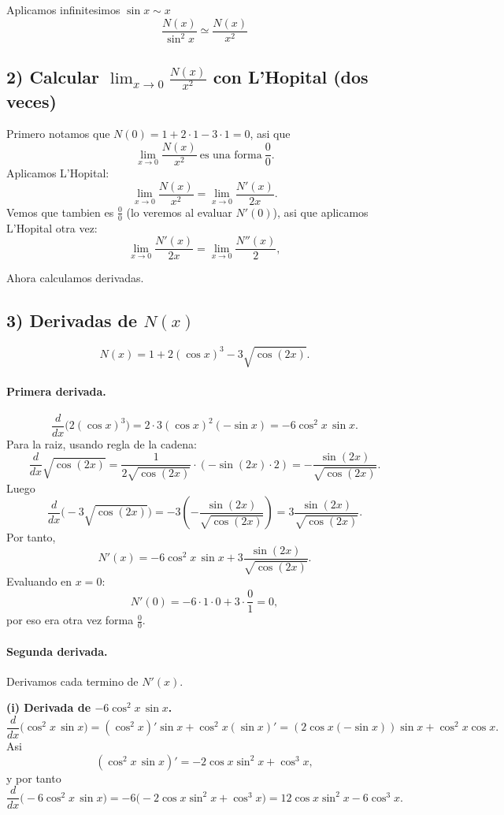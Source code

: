 \documentclass[12pt]{article}
\begin{document}
Aplicamos infinitesimos $\sin x \sim x$
\[
\frac{N(x)}{\sin^2 x}
\simeq \frac{N(x)}{x^2}
\]


\subsection*{2) Calcular $\displaystyle \lim_{x\to 0}\frac{N(x)}{x^2}$ con L'Hopital (dos veces)}
Primero notamos que $N(0)=1+2\cdot 1-3\cdot 1=0$, asi que
\[
\lim_{x\to 0}\frac{N(x)}{x^2}
\ \text{es una forma}\ \frac{0}{0}.
\]
Aplicamos L'Hopital:
\[
\lim_{x\to 0}\frac{N(x)}{x^2}
=\lim_{x\to 0}\frac{N'(x)}{2x}.
\]
Vemos que tambien es $\frac{0}{0}$ (lo veremos al evaluar $N'(0)$), asi que aplicamos L'Hopital otra vez:
\[
\lim_{x\to 0}\frac{N'(x)}{2x}
=\lim_{x\to 0}\frac{N''(x)}{2},
\]

Ahora calculamos derivadas.

\subsection*{3) Derivadas de $N(x)$}
\[
N(x)=1+2(\cos x)^3-3\sqrt{\cos(2x)}.
\]

\paragraph{Primera derivada.}
\[
\frac{d}{dx}\bigl(2(\cos x)^3\bigr)=2\cdot 3(\cos x)^2(-\sin x)=-6\cos^2 x\,\sin x.
\]
Para la raiz, usando regla de la cadena:
\[
\frac{d}{dx}\sqrt{\cos(2x)}
=\frac{1}{2\sqrt{\cos(2x)}}\cdot(-\sin(2x)\cdot 2)
=-\frac{\sin(2x)}{\sqrt{\cos(2x)}}.
\]
Luego
\[
\frac{d}{dx}\bigl(-3\sqrt{\cos(2x)}\bigr)
=-3\left(-\frac{\sin(2x)}{\sqrt{\cos(2x)}}\right)
=3\frac{\sin(2x)}{\sqrt{\cos(2x)}}.
\]
Por tanto,
\[
N'(x)=-6\cos^2 x\,\sin x+3\frac{\sin(2x)}{\sqrt{\cos(2x)}}.
\]
Evaluando en $x=0$:
\[
N'(0)=-6\cdot 1\cdot 0+3\cdot \frac{0}{1}=0,
\]
por eso era otra vez forma $\frac{0}{0}$.

\paragraph{Segunda derivada.}
Derivamos cada termino de $N'(x)$.

\textbf{(i) Derivada de $-6\cos^2 x\,\sin x$.}
\[
\frac{d}{dx}\bigl(\cos^2 x\,\sin x\bigr)
=(\cos^2 x)'\sin x+\cos^2 x(\sin x)'
= (2\cos x(-\sin x))\sin x+\cos^2 x\cos x.
\]
Asi
\[
(\cos^2 x\,\sin x)'=-2\cos x\sin^2 x+\cos^3 x,
\]
y por tanto
\[
\frac{d}{dx}\bigl(-6\cos^2 x\,\sin x\bigr)
=-6\bigl(-2\cos x\sin^2 x+\cos^3 x\bigr)
=12\cos x\sin^2 x-6\cos^3 x.
\]
\end{document}
